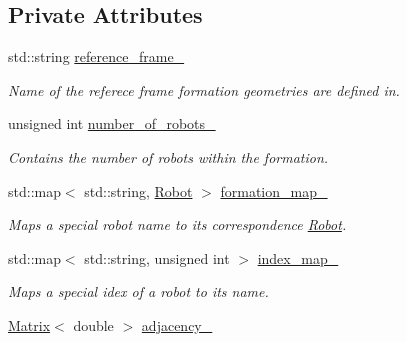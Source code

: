 \subsection*{Private Attributes}
\begin{DoxyCompactItemize}
\item 
std\+::string \hyperlink{classFormation_aded9be036260714976d7b2344343aa36}{reference\+\_\+frame\+\_\+}\hypertarget{classFormation_aded9be036260714976d7b2344343aa36}{}\label{classFormation_aded9be036260714976d7b2344343aa36}

\begin{DoxyCompactList}\small\item\em Name of the referece frame formation geometries are defined in. \end{DoxyCompactList}\item 
unsigned int \hyperlink{classFormation_a37afd22fcc314d948dfdf1012ee8e0b5}{number\+\_\+of\+\_\+robots\+\_\+}\hypertarget{classFormation_a37afd22fcc314d948dfdf1012ee8e0b5}{}\label{classFormation_a37afd22fcc314d948dfdf1012ee8e0b5}

\begin{DoxyCompactList}\small\item\em Contains the number of robots within the formation. \end{DoxyCompactList}\item 
std\+::map$<$ std\+::string, \hyperlink{structFormation_1_1Robot}{Robot} $>$ \hyperlink{classFormation_a97b2e99a4484d35efb628a8c1856fce1}{formation\+\_\+map\+\_\+}\hypertarget{classFormation_a97b2e99a4484d35efb628a8c1856fce1}{}\label{classFormation_a97b2e99a4484d35efb628a8c1856fce1}

\begin{DoxyCompactList}\small\item\em Maps a special robot name to its correspondence \hyperlink{structFormation_1_1Robot}{Robot}. \end{DoxyCompactList}\item 
std\+::map$<$ std\+::string, unsigned int $>$ \hyperlink{classFormation_a828cdf6334de77b7858687066c107610}{index\+\_\+map\+\_\+}\hypertarget{classFormation_a828cdf6334de77b7858687066c107610}{}\label{classFormation_a828cdf6334de77b7858687066c107610}

\begin{DoxyCompactList}\small\item\em Maps a special idex of a robot to its name. \end{DoxyCompactList}\item 
\hyperlink{classFormation_a227cd099c5171dd7a8f66cf010793e4e}{Matrix}$<$ double $>$ \hyperlink{classFormation_a4381913dde85c784c452c38782c88c3d}{adjacency\+\_\+}\hypertarget{classFormation_a4381913dde85c784c452c38782c88c3d}{}\label{classFormation_a4381913dde85c784c452c38782c88c3d}


\end{DoxyCompactItemize}
